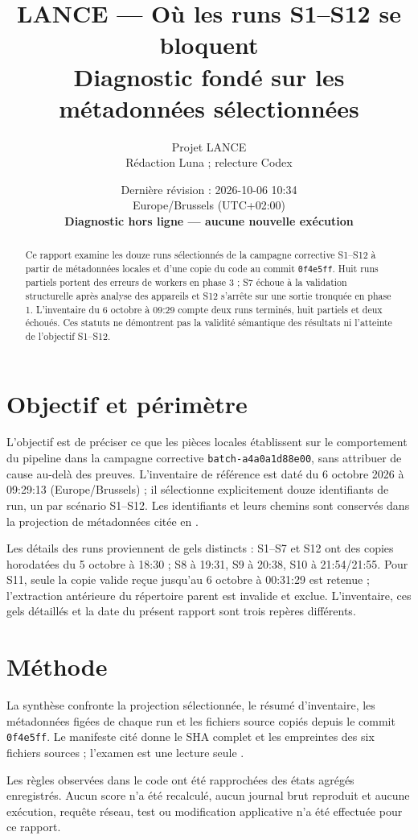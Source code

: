 \documentclass[11pt,a4paper]{article}
\title{LANCE — Où les runs S1–S12 se bloquent\\\large Diagnostic fondé sur les métadonnées sélectionnées}
\author{Projet LANCE\\\small Rédaction Luna ; relecture Codex}
\date{Dernière révision : 2026-10-06 10:34\\Europe/Brussels (UTC+02:00)\\\textbf{Diagnostic hors ligne — aucune nouvelle exécution}}
\newcommand{\code}[1]{{\urlstyle{tt}\nolinkurl{#1}}}
\begin{document}
\maketitle
\begin{abstract}
Ce rapport examine les douze runs sélectionnés de la campagne corrective S1–S12 à partir de métadonnées locales et d'une copie du code au commit \code{0f4e5ff}. Huit runs partiels portent des erreurs de workers en phase 3 ; S7 échoue à la validation structurelle après analyse des appareils et S12 s'arrête sur une sortie tronquée en phase 1. L'inventaire du 6 octobre à 09:29 compte deux runs terminés, huit partiels et deux échoués. Ces statuts ne démontrent pas la validité sémantique des résultats ni l'atteinte de l'objectif S1–S12.
\end{abstract}
\tableofcontents
\section{Objectif et périmètre}
L'objectif est de préciser ce que les pièces locales établissent sur le comportement du pipeline dans la campagne corrective \code{batch-a4a0a1d88e00}, sans attribuer de cause au-delà des preuves. L'inventaire de référence est daté du 6 octobre 2026 à 09:29:13 (Europe/Brussels) ; il sélectionne explicitement douze identifiants de run, un par scénario S1–S12. Les identifiants et leurs chemins sont conservés dans la projection de métadonnées citée en \cite{projection}.

Les détails des runs proviennent de gels distincts : S1–S7 et S12 ont des copies horodatées du 5 octobre à 18:30 ; S8 à 19:31, S9 à 20:38, S10 à 21:54/21:55. Pour S11, seule la copie valide reçue jusqu'au 6 octobre à 00:31:29 est retenue ; l'extraction antérieure du répertoire parent est invalide et exclue. L'inventaire, ces gels détaillés et la date du présent rapport sont trois repères différents.
\section{Méthode}
La synthèse confronte la projection sélectionnée, le résumé d'inventaire, les métadonnées figées de chaque run et les fichiers source copiés depuis le commit \code{0f4e5ff}. Le manifeste cité donne le SHA complet et les empreintes des six fichiers sources ; l'examen est une lecture seule \cite{provenance}.

Les règles observées dans le code ont été rapprochées des états agrégés enregistrés. Aucun score n'a été recalculé, aucun journal brut reproduit et aucune exécution, requête réseau, test ou modification applicative n'a été effectuée pour ce rapport.
\end{document}
